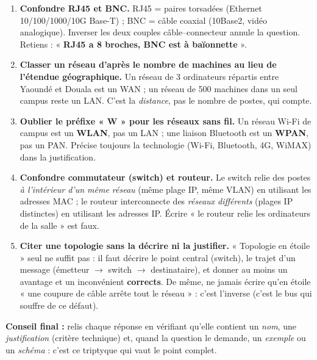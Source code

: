 \documentclass[11pt]{article}
\newcommand{\cle}[1]{{\popxbold\color{popdark}#1}}
\begin{document}
\begin{attention}
\begin{enumerate}
  \item \textbf{Confondre RJ45 et BNC.} RJ45 = paires torsadées (Ethernet 10/100/1000/10G Base-T) ; BNC = câble coaxial (10Base2, vidéo analogique). Inverser les deux couples câble--connecteur annule la question. Retiens : « \textbf{RJ45 a 8 broches, BNC est à baïonnette} ».
  \item \textbf{Classer un réseau d'après le nombre de machines au lieu de l'étendue géographique.} Un réseau de 3 ordinateurs répartis entre Yaoundé et Douala est un WAN ; un réseau de 500 machines dans un seul campus reste un LAN. C'est la \emph{distance}, pas le nombre de postes, qui compte.
  \item \textbf{Oublier le préfixe « W » pour les réseaux sans fil.} Un réseau Wi-Fi de campus est un \textbf{WLAN}, pas un LAN ; une liaison Bluetooth est un \textbf{WPAN}, pas un PAN. Précise toujours la technologie (Wi-Fi, Bluetooth, 4G, WiMAX) dans la justification.
  \item \textbf{Confondre commutateur (switch) et routeur.} Le switch relie des postes \emph{à l'intérieur d'un même réseau} (même plage IP, même VLAN) en utilisant les adresses \cle{MAC} ; le routeur interconnecte des \emph{réseaux différents} (plages IP distinctes) en utilisant les adresses \cle{IP}. Écrire « le routeur relie les ordinateurs de la salle » est faux.
  \item \textbf{Citer une topologie sans la décrire ni la justifier.} « Topologie en étoile » seul ne suffit pas : il faut décrire le point central (switch), le trajet d'un message (émetteur $\rightarrow$ switch $\rightarrow$ destinataire), et donner au moins un avantage et un inconvénient \textbf{corrects}. De même, ne jamais écrire qu'en étoile « une coupure de câble arrête tout le réseau » : c'est l'inverse (c'est le bus qui souffre de ce défaut).
\end{enumerate}
\textbf{Conseil final :} relis chaque réponse en vérifiant qu'elle contient un \emph{nom}, une \emph{justification} (critère technique) et, quand la question le demande, un \emph{exemple} ou un \emph{schéma} : c'est ce triptyque qui vaut le point complet.
\end{attention}
\end{document}
